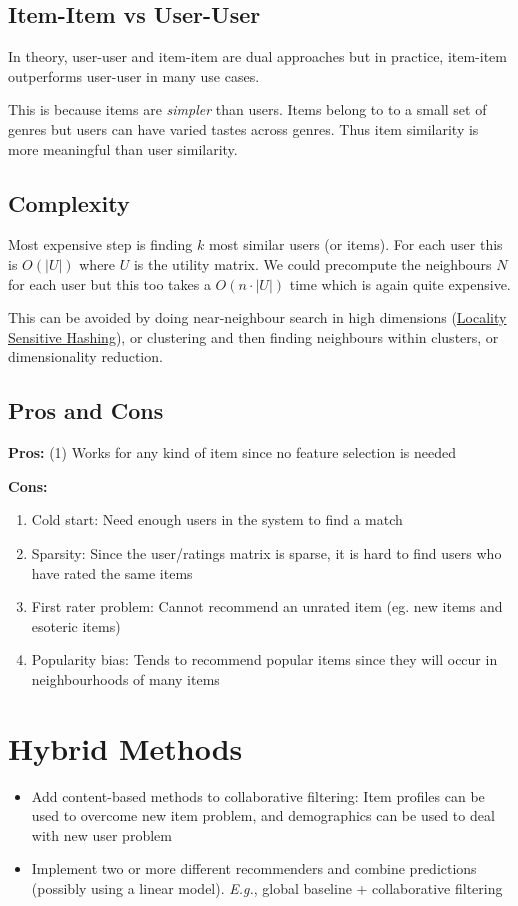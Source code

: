 \documentclass{article}
\begin{document}
\subsection{Item-Item vs User-User}
In theory, user-user and item-item are dual approaches but in practice, item-item outperforms user-user in many use cases.

This is because items are \textit{simpler} than users. Items belong to to a small set of genres but users can have varied tastes across genres. Thus item similarity is more meaningful than user similarity.

\subsection{Complexity}
Most expensive step is finding $k$ most similar users (or items). For each user this is $O(|U|)$ where $U$ is the utility matrix. We could precompute the neighbours $N$ for each user but this too takes a $O(n\cdot|U|)$ time which is again quite expensive.

This can be avoided by doing near-neighbour search in high dimensions (\href{https://en.wikipedia.org/wiki/Locality-sensitive_hashing}{Locality Sensitive Hashing}), or clustering and then finding neighbours within clusters, or dimensionality reduction.

\subsection{Pros and Cons}
\textbf{Pros:} (1) Works for any kind of item since no feature selection is needed

\textbf{Cons:} 
\begin{enumerate}[label=(\arabic*), topsep=0in]
\item Cold start: Need enough users in the system to find a match
\item Sparsity: Since the user/ratings matrix is sparse, it is hard to find users who have rated the same items
\item First rater problem: Cannot recommend an unrated item (eg. new items and esoteric items)
\item Popularity bias: Tends to recommend popular items since they will occur in neighbourhoods of many items
\end{enumerate}

\section{Hybrid Methods}
\begin{itemize}
    \item Add content-based methods to collaborative filtering: Item profiles can be used to overcome new item problem, and demographics can be used to deal with new user problem
    \item Implement two or more different recommenders and combine predictions (possibly using a linear model). \textit{E.g.}, global baseline + collaborative filtering
\end{itemize}
\end{document}
